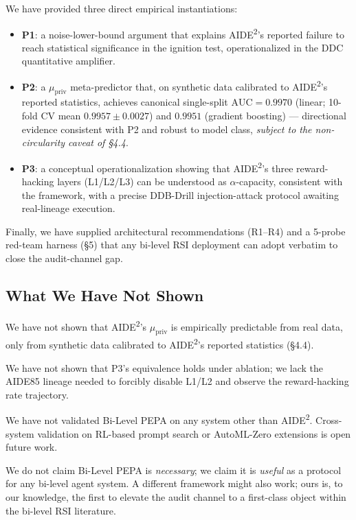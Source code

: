 \documentclass{article}
\theoremstyle{definition}
\begin{document}
We have provided three direct empirical instantiations:
\begin{itemize}
    \item \textbf{P1}: a noise-lower-bound argument that explains AIDE\textsuperscript{2}'s reported failure to reach statistical significance in the ignition test, operationalized in the DDC quantitative amplifier.
    \item \textbf{P2}: a $\mu_{\text{priv}}$ meta-predictor that, on synthetic data calibrated to AIDE\textsuperscript{2}'s reported statistics, achieves canonical single-split $\text{AUC}=0.9970$ (linear; 10-fold CV mean $0.9957\pm0.0027$) and $0.9951$ (gradient boosting) --- directional evidence consistent with P2 and robust to model class, \emph{subject to the non-circularity caveat of \S4.4}.
    \item \textbf{P3}: a conceptual operationalization showing that AIDE\textsuperscript{2}'s three reward-hacking layers (L1/L2/L3) can be understood as $\alpha$-capacity, consistent with the framework, with a precise DDB-Drill injection-attack protocol awaiting real-lineage execution.
\end{itemize}

Finally, we have supplied architectural recommendations (R1--R4) and a 5-probe red-team harness (\S5) that any bi-level RSI deployment can adopt verbatim to close the audit-channel gap.

\subsection{What We Have Not Shown}

We have not shown that AIDE\textsuperscript{2}'s $\mu_{\text{priv}}$ is empirically predictable from real data, only from synthetic data calibrated to AIDE\textsuperscript{2}'s reported statistics (\S4.4).

We have not shown that P3's equivalence holds under ablation; we lack the AIDE85 lineage needed to forcibly disable L1/L2 and observe the reward-hacking rate trajectory.

We have not validated Bi-Level PEPA on any system other than AIDE\textsuperscript{2}. Cross-system validation on RL-based prompt search or AutoML-Zero extensions is open future work.

We do not claim Bi-Level PEPA is \emph{necessary}; we claim it is \emph{useful} as a protocol for any bi-level agent system. A different framework might also work; ours is, to our knowledge, the first to elevate the audit channel to a first-class object within the bi-level RSI literature.
\end{document}
